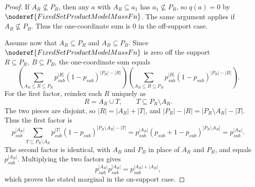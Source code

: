 \begin{proof}
If \(A_R\not\subseteq P_R\), then any \(a\) with \(A_R\subseteq a_1\) has
\(a_1\not\subseteq P_R\), so \(q(a)=0\) by
\(\noderef{FixedSetProductModelMassFn}\).  The same argument applies if
\(A_B\not\subseteq P_B\).  Thus the one-coordinate sum is \(0\) in the
off-support case.

Assume now that \(A_R\subseteq P_R\) and \(A_B\subseteq P_B\).  Since
\(\noderef{FixedSetProductModelMassFn}\) is zero off the support
\(R\subseteq P_R,\ B\subseteq P_B\), the one-coordinate sum equals
\[
\left(
\sum_{A_R\subseteq R\subseteq P_R}
  p_{sub}^{|R|}(1-p_{sub})^{|P_R|-|R|}
\right)
\left(
\sum_{A_B\subseteq B\subseteq P_B}
  p_{sub}^{|B|}(1-p_{sub})^{|P_B|-|B|}
\right).
\]
For the first factor, reindex each \(R\) uniquely as
\[
R=A_R\cup T,\qquad T\subseteq P_R\setminus A_R.
\]
The two pieces are disjoint, so \(|R|=|A_R|+|T|\), and
\(|P_R|-|R|=|P_R\setminus A_R|-|T|\).  Thus the first factor is
\[
p_{sub}^{|A_R|}
\sum_{T\subseteq P_R\setminus A_R}
  p_{sub}^{|T|}(1-p_{sub})^{|P_R\setminus A_R|-|T|}
=p_{sub}^{|A_R|}(p_{sub}+1-p_{sub})^{|P_R\setminus A_R|}
=p_{sub}^{|A_R|}.
\]
The second factor is identical, with \(A_B\) and \(P_B\) in place of
\(A_R\) and \(P_R\), and equals \(p_{sub}^{|A_B|}\).  Multiplying the two
factors gives
\[
p_{sub}^{|A_R|}p_{sub}^{|A_B|}
=p_{sub}^{|A_R|+|A_B|},
\]
which proves the stated marginal in the on-support case.
\end{proof}
